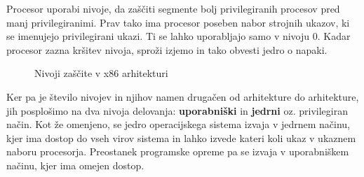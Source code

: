 \documentclass[a4paper,12pt,openright]{book}
\begin{document}
Procesor uporabi nivoje, da zaščiti segmente bolj privilegiranih procesov pred manj privilegiranimi.
Prav tako ima procesor poseben nabor strojnih ukazov, ki se imenujejo privilegirani ukazi.
Ti se lahko uporabljajo samo v nivoju 0.
Kadar procesor zazna kršitev nivoja, sproži izjemo in tako obvesti jedro o napaki.

\begin{figure}[h!]
	\begin{center}
	\end{center}
	\caption{Nivoji zaščite v x86 arhitekturi \cite{Intel_2024}}
	\label{fig:privilege_levels_x86}
\end{figure}

Ker pa je število nivojev in njihov namen drugačen od arhitekture do arhitekture, jih posplošimo na dva nivoja delovanja: \textbf{uporabniški} in \textbf{jedrni} oz. privilegiran način.
Kot že omenjeno, se jedro operacijskega sistema izvaja v jedrnem načinu, kjer ima dostop do vseh virov sistema in lahko izvede kateri koli ukaz v ukaznem naboru procesorja.
Preostanek programske opreme pa se izvaja v uporabniškem načinu, kjer ima omejen dostop.
\end{document}
